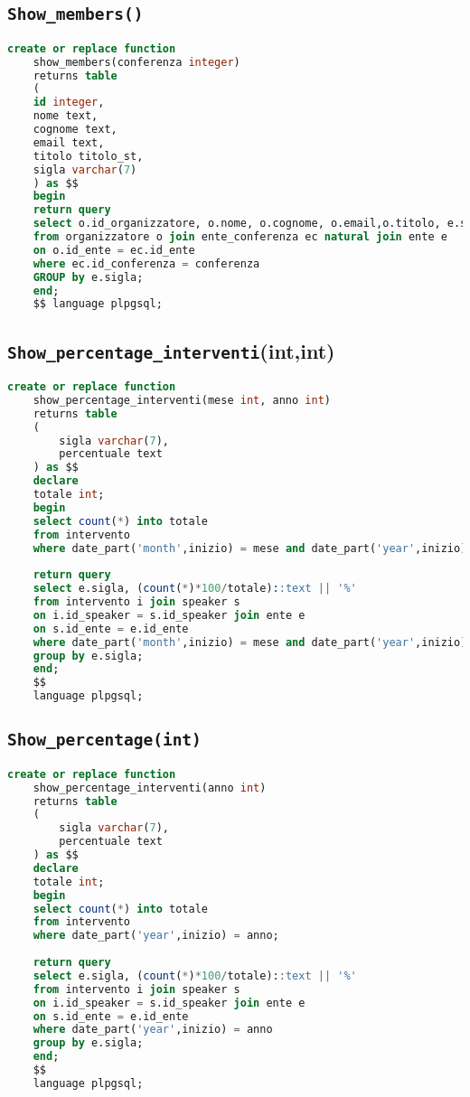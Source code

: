 \subsection{\texttt{Show\_members()}}
\begin{lstlisting}[language=SQL,style=mystyle]
	create or replace function 
	show_members(conferenza integer)
	returns table 
	(
	id integer, 
	nome text, 
	cognome text, 
	email text,
	titolo titolo_st, 
	sigla varchar(7)
	) as $$
	begin
	return query
	select o.id_organizzatore, o.nome, o.cognome, o.email,o.titolo, e.sigla
	from organizzatore o join ente_conferenza ec natural join ente e  
	on o.id_ente = ec.id_ente
	where ec.id_conferenza = conferenza
	GROUP by e.sigla;
	end;
	$$ language plpgsql;
\end{lstlisting}
\subsection{\texttt{Show\_percentage\_interventi}(int,int)}
\begin{lstlisting}[language=SQL,style=mystyle]
	create or replace function 
	show_percentage_interventi(mese int, anno int)
	returns table
	(
		sigla varchar(7),
		percentuale text
	) as $$
	declare
	totale int;
	begin
	select count(*) into totale
	from intervento
	where date_part('month',inizio) = mese and date_part('year',inizio) = anno;
	
	return query
	select e.sigla, (count(*)*100/totale)::text || '%'
	from intervento i join speaker s 
	on i.id_speaker = s.id_speaker join ente e 
	on s.id_ente = e.id_ente
	where date_part('month',inizio) = mese and date_part('year',inizio) = anno
	group by e.sigla;
	end;
	$$ 
	language plpgsql;
\end{lstlisting}
\subsection{\texttt{Show\_percentage(int)}}
\begin{lstlisting}[language=SQL,style=mystyle]
	create or replace function 
	show_percentage_interventi(anno int)
	returns table
	(
		sigla varchar(7),
		percentuale text
	) as $$
	declare
	totale int;
	begin
	select count(*) into totale
	from intervento
	where date_part('year',inizio) = anno;
	
	return query
	select e.sigla, (count(*)*100/totale)::text || '%'
	from intervento i join speaker s 
	on i.id_speaker = s.id_speaker join ente e 
	on s.id_ente = e.id_ente
	where date_part('year',inizio) = anno
	group by e.sigla;
	end;
	$$ 
	language plpgsql;
\end{lstlisting}

